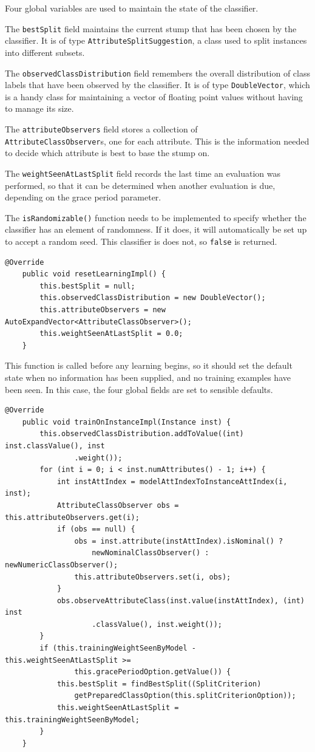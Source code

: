 \documentclass[a4paper,12pt]{article}
\begin{document}
Four global variables are used to maintain the state of the classifier.

The \verb+bestSplit+ field maintains the current stump that has been chosen by the classifier. It is of type \verb+AttributeSplitSuggestion+, a class used to split instances into different subsets.

The \verb+observedClassDistribution+ field remembers the overall distribution of class labels that have been observed by the classifier. It is of type \verb+DoubleVector+, which is a handy class for maintaining a vector of floating point values without having to manage its size.

The \verb+attributeObservers+ field stores a collection of \\ \verb+AttributeClassObserver+s, one for each attribute. This is the information needed to decide which attribute is best to base the stump on.

The \verb+weightSeenAtLastSplit+ field records the last time an evaluation was performed, so that it can be determined when another evaluation is due, depending on the grace period parameter.

The \verb+isRandomizable()+ function needs to be implemented to specify whether the classifier has an element of randomness. If it does, it will automatically be set up to accept a random seed. This classifier is does not, so \verb+false+ is returned.

\begin{lstlisting}[caption={Preparing for learning},label=lst:preplearn,firstnumber=37]
	@Override
	public void resetLearningImpl() {
		this.bestSplit = null;
		this.observedClassDistribution = new DoubleVector();
		this.attributeObservers = new AutoExpandVector<AttributeClassObserver>();
		this.weightSeenAtLastSplit = 0.0;
	}
\end{lstlisting}

This function is called before any learning begins, so it should set the default state when no information has been supplied, and no training examples have been seen. In this case, the four global fields are set to sensible defaults.
\newpage
\begin{lstlisting}[caption={Training on examples},label=lst:train,firstnumber=45]
	@Override
	public void trainOnInstanceImpl(Instance inst) {
		this.observedClassDistribution.addToValue((int) inst.classValue(), inst
				.weight());
		for (int i = 0; i < inst.numAttributes() - 1; i++) {
			int instAttIndex = modelAttIndexToInstanceAttIndex(i, inst);
			AttributeClassObserver obs = this.attributeObservers.get(i);
			if (obs == null) {
				obs = inst.attribute(instAttIndex).isNominal() ?
					newNominalClassObserver() : newNumericClassObserver();
				this.attributeObservers.set(i, obs);
			}
			obs.observeAttributeClass(inst.value(instAttIndex), (int) inst
					.classValue(), inst.weight());
		}
		if (this.trainingWeightSeenByModel - this.weightSeenAtLastSplit >=
				this.gracePeriodOption.getValue()) {
			this.bestSplit = findBestSplit((SplitCriterion)
				getPreparedClassOption(this.splitCriterionOption));
			this.weightSeenAtLastSplit = this.trainingWeightSeenByModel;
		}
	}
\end{lstlisting}
\end{document}
